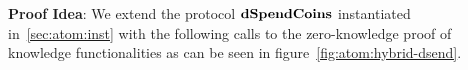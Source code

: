 \textbf{Proof Idea}: We extend the protocol $\mathbf{dSpendCoins}$ instantiated in~\ref{sec:atom:inst} with the following calls to the zero-knowledge proof of knowledge functionalities as can be seen in figure~\ref{fig:atom:hybrid-dsend}.

\begin{figure}
\end{figure}
